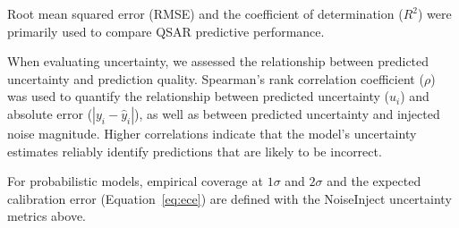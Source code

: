 
Root mean squared error (RMSE) and the coefficient of determination ($R^2$) were primarily used to compare QSAR predictive performance.


When evaluating uncertainty, we assessed the relationship between predicted uncertainty and prediction quality. Spearman's rank correlation coefficient ($\rho$) was used to quantify the relationship between predicted uncertainty ($u_i$) and absolute error ($|y_i - \hat{y}_i|$), as well as between predicted uncertainty and injected noise magnitude. Higher correlations indicate that the model's uncertainty estimates reliably identify predictions that are likely to be incorrect.

For probabilistic models, empirical coverage at $1\sigma$ and $2\sigma$ and the expected calibration error (Equation~\ref{eq:ece}) are defined with the NoiseInject uncertainty metrics above.

